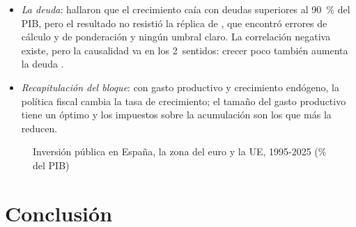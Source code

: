 \documentclass[11pt]{article}
\begin{document}
\begin{itemize}
\item \emph{La deuda}: \textcite{ReinhartRogoff2010Growth} hallaron que el crecimiento caía con deudas superiores al 90~\% del PIB, pero el resultado no resistió la réplica de \textcite{HerndonAshPollin2014}, que encontró errores de cálculo y de ponderación y ningún umbral claro. La correlación negativa existe, pero la causalidad va en los 2~sentidos: crecer poco también aumenta la deuda .
\item \emph{Recapitulación del bloque}: con gasto productivo y crecimiento endógeno, la política fiscal cambia la tasa de crecimiento; el tamaño del gasto productivo tiene un óptimo y los impuestos sobre la acumulación son los que más la reducen.
\end{itemize}

\begin{figure}[H]
\centering
\caption{Inversión pública en España, la zona del euro y la UE, 1995-2025 (\% del PIB)}\label{fig:inversion-publica-espana}
\end{figure}

\section*{Conclusión}
\end{document}
